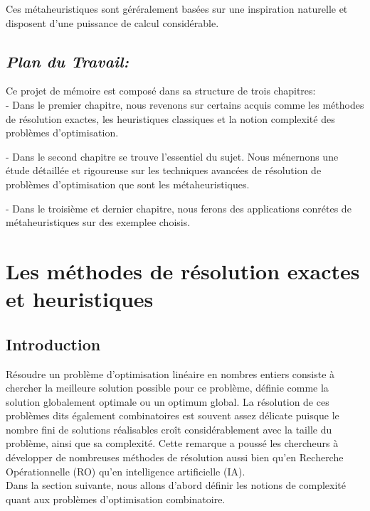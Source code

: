 \documentclass[a4paper,11pt,oneside]{report}
\theoremstyle{plain}
\newcommand{\0}{/ \! \! \! 0}
\theoremstyle{plain}
\begin{document}
Ces m\'etaheuristiques sont g\'er\'eralement bas\'ees sur une inspiration naturelle et disposent d'une puissance de calcul consid\'erable.  

\section*{\it Plan du Travail:}
Ce projet de m\'emoire est compos\'e dans sa structure de trois chapitres:\\
 
 - Dans le premier chapitre, nous revenons sur certains acquis comme les m\'ethodes de r\'esolution exactes, les heuristiques classiques et la notion 
 complexit\'e des probl\`emes d'optimisation.

 - Dans le second chapitre se trouve l'essentiel du sujet. Nous m\'enernons une \'etude d\'etaill\'ee et rigoureuse sur les techniques avanc\'ees 
 de r\'esolution de probl\`emes d'optimisation que sont les m\'etaheuristiques.
 
 - Dans le troisi\`eme et dernier chapitre, nous ferons des applications conr\'etes de m\'etaheuristiques sur des exemplee choisis.

\chapter{Les m\'ethodes de r\'esolution exactes et heuristiques}
\section{Introduction}
R\'esoudre un probl\`eme d'optimisation lin\'eaire en nombres entiers consiste \`a chercher la meilleure solution possible pour ce probl\`eme, 
d\'efinie comme la solution globalement optimale ou un optimum global. La r\'esolution de ces probl\`emes dits \'egalement combinatoires est
souvent assez d\'elicate puisque le nombre fini de solutions r\'ealisables cro\^it consid\'erablement avec la taille du probl\`eme, ainsi que sa 
complexit\'e. Cette remarque a pouss\'e les chercheurs \`a d\'evelopper de nombreuses m\'ethodes de r\'esolution aussi bien qu'en Recherche Op\'erationnelle
(RO) qu'en intelligence artificielle (IA).\\
Dans la section suivante, nous allons d'abord d\'efinir les notions de complexit\'e quant aux probl\`emes d'optimisation combinatoire.
\end{document}
